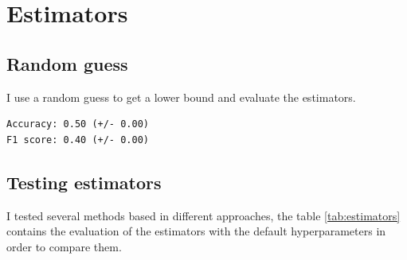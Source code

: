 \documentclass[a4paper]{article}
\begin{document}
\section{Estimators}

\subsection{Random guess}
I use a random guess to get a lower bound and evaluate the estimators.
\begin{verbatim}
Accuracy: 0.50 (+/- 0.00)
F1 score: 0.40 (+/- 0.00)
\end{verbatim}

\subsection{Testing estimators}

I tested several methods based in different approaches, the table
\ref{tab:estimators} contains the evaluation of the estimators
with the default hyperparameters in order to compare them.
\end{document}
